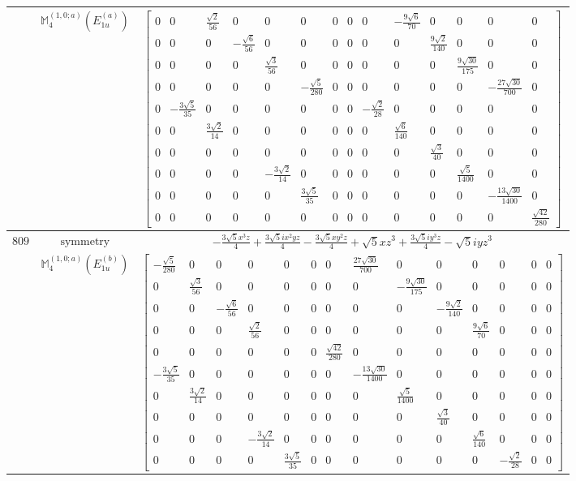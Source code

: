 \documentclass[fleqn,8pt,landscape]{jsarticle}
\begin{document}
\begin{longtable}{ccc}
$  $ & $ \mathbb{M}_{4}^{(1,0;a)}(E_{1u}^{(a)}) $ & $ \begin{bmatrix} 0 & 0 & \frac{\sqrt{2}}{56} & 0 & 0 & 0 & 0 & 0 & 0 & - \frac{9 \sqrt{6}}{70} & 0 & 0 & 0 & 0 \\ 0 & 0 & 0 & - \frac{\sqrt{6}}{56} & 0 & 0 & 0 & 0 & 0 & 0 & \frac{9 \sqrt{2}}{140} & 0 & 0 & 0 \\ 0 & 0 & 0 & 0 & \frac{\sqrt{3}}{56} & 0 & 0 & 0 & 0 & 0 & 0 & \frac{9 \sqrt{30}}{175} & 0 & 0 \\ 0 & 0 & 0 & 0 & 0 & - \frac{\sqrt{5}}{280} & 0 & 0 & 0 & 0 & 0 & 0 & - \frac{27 \sqrt{30}}{700} & 0 \\ 0 & - \frac{3 \sqrt{5}}{35} & 0 & 0 & 0 & 0 & 0 & 0 & - \frac{\sqrt{2}}{28} & 0 & 0 & 0 & 0 & 0 \\ 0 & 0 & \frac{3 \sqrt{2}}{14} & 0 & 0 & 0 & 0 & 0 & 0 & \frac{\sqrt{6}}{140} & 0 & 0 & 0 & 0 \\ 0 & 0 & 0 & 0 & 0 & 0 & 0 & 0 & 0 & 0 & \frac{\sqrt{3}}{40} & 0 & 0 & 0 \\ 0 & 0 & 0 & 0 & - \frac{3 \sqrt{2}}{14} & 0 & 0 & 0 & 0 & 0 & 0 & \frac{\sqrt{5}}{1400} & 0 & 0 \\ 0 & 0 & 0 & 0 & 0 & \frac{3 \sqrt{5}}{35} & 0 & 0 & 0 & 0 & 0 & 0 & - \frac{13 \sqrt{30}}{1400} & 0 \\ 0 & 0 & 0 & 0 & 0 & 0 & 0 & 0 & 0 & 0 & 0 & 0 & 0 & \frac{\sqrt{42}}{280} \end{bmatrix} $ \\ \hline
$ 809 $ & $ \text{symmetry} $ & $ - \frac{3 \sqrt{5} x^{3} z}{4} + \frac{3 \sqrt{5} i x^{2} y z}{4} - \frac{3 \sqrt{5} x y^{2} z}{4} + \sqrt{5} x z^{3} + \frac{3 \sqrt{5} i y^{3} z}{4} - \sqrt{5} i y z^{3} $ \\
$  $ & $ \mathbb{M}_{4}^{(1,0;a)}(E_{1u}^{(b)}) $ & $ \begin{bmatrix} - \frac{\sqrt{5}}{280} & 0 & 0 & 0 & 0 & 0 & 0 & \frac{27 \sqrt{30}}{700} & 0 & 0 & 0 & 0 & 0 & 0 \\ 0 & \frac{\sqrt{3}}{56} & 0 & 0 & 0 & 0 & 0 & 0 & - \frac{9 \sqrt{30}}{175} & 0 & 0 & 0 & 0 & 0 \\ 0 & 0 & - \frac{\sqrt{6}}{56} & 0 & 0 & 0 & 0 & 0 & 0 & - \frac{9 \sqrt{2}}{140} & 0 & 0 & 0 & 0 \\ 0 & 0 & 0 & \frac{\sqrt{2}}{56} & 0 & 0 & 0 & 0 & 0 & 0 & \frac{9 \sqrt{6}}{70} & 0 & 0 & 0 \\ 0 & 0 & 0 & 0 & 0 & 0 & \frac{\sqrt{42}}{280} & 0 & 0 & 0 & 0 & 0 & 0 & 0 \\ - \frac{3 \sqrt{5}}{35} & 0 & 0 & 0 & 0 & 0 & 0 & - \frac{13 \sqrt{30}}{1400} & 0 & 0 & 0 & 0 & 0 & 0 \\ 0 & \frac{3 \sqrt{2}}{14} & 0 & 0 & 0 & 0 & 0 & 0 & \frac{\sqrt{5}}{1400} & 0 & 0 & 0 & 0 & 0 \\ 0 & 0 & 0 & 0 & 0 & 0 & 0 & 0 & 0 & \frac{\sqrt{3}}{40} & 0 & 0 & 0 & 0 \\ 0 & 0 & 0 & - \frac{3 \sqrt{2}}{14} & 0 & 0 & 0 & 0 & 0 & 0 & \frac{\sqrt{6}}{140} & 0 & 0 & 0 \\ 0 & 0 & 0 & 0 & \frac{3 \sqrt{5}}{35} & 0 & 0 & 0 & 0 & 0 & 0 & - \frac{\sqrt{2}}{28} & 0 & 0 \end{bmatrix} $ \\ \hline

\end{longtable}
\end{document}
